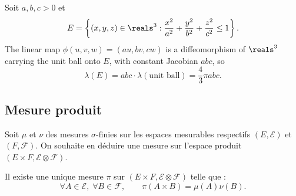 \begin{example}
  Soit $a,b,c > 0$ et
  \[
    E = \left\{ (x,y,z) \in \reals^{3} :
      \frac{x^{2}}{a^{2}} + \frac{y^{2}}{b^{2}} + \frac{z^{2}}{c^{2}} \leq 1
    \right\} .
  \]
  The linear map $\phi(u,v,w) = (au,bv,cw)$ is a diffeomorphism of $\reals^{3}$
  carrying the unit ball onto $E$, with constant Jacobian $abc$, so
  \[
    \lambda(E) = abc \cdot \lambda(\text{unit ball}) = \frac{4}{3} \pi abc .
  \]
\end{example}

\subsection{Mesure produit}

Soit $\mu$ et $\nu$ des mesures $\sigma$-finies sur les espaces mesurables
respectifs $(E,\mathcal{E})$ et $(F,\mathcal{F})$. On souhaite en déduire une mesure
sur l'espace produit $(E \times F, \mathcal{E} \otimes \mathcal{F})$.

\begin{theorem}
  Il existe une unique mesure $\pi$ sur $(E \times F, \mathcal{E} \otimes
  \mathcal{F})$ telle que :
  \[
    \forall A \in \mathcal{E}, \; \forall B \in \mathcal{F}, \qquad
    \pi(A \times B) = \mu(A) \nu(B) .
  \]
\end{theorem}

